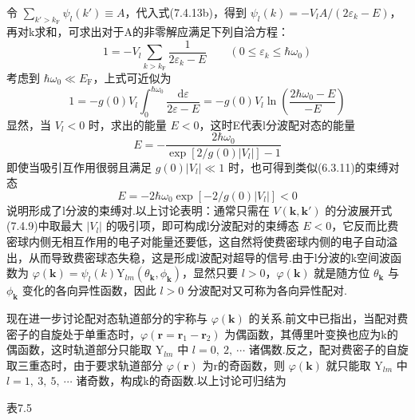 令 $\sum\limits_{k'>k_{\mathrm{F}}}\psi_{l}(k')\equiv A$，代入式(7.4.13b)，得到 $\psi_{l}(k)=-V_{l}A/\left(2\varepsilon_{k}-E\right)$，再对k求和，可求出对于A的非零解应满足下列自洽方程：
\begin{equation}
  1=-V_{l}\sum_{k>k_{\mathrm{F}}}\frac{1}{2\varepsilon_{k}-E}
  \qquad\left(0\leqslant\varepsilon_{k}\leqslant\hbar\omega_{0}\right)
\end{equation}
考虑到 $\hbar\omega_{0}\ll E_{\mathrm{F}}$，上式可近似为
\begin{equation}
  1=-g(0)V_{l}\int_{0}^{\hbar\omega_{0}}\frac{\mathrm{d}\varepsilon}{2\varepsilon-E}
  =-g(0)V_{l}\ln\left(\frac{2\hbar\omega_{0}-E}{-E}\right)
\end{equation}
显然，当 $V_{l}<0$ 时，求出的能量 $E<0$，这时E代表l分波配对态的能量
\begin{equation}
  E=-\frac{2\hbar\omega_{0}}{\exp\left[2/g(0)\left|V_{l}\right|\right]-1}
\end{equation}
即使当吸引互作用很弱且满足 $g(0)\left|V_{l}\right|\ll1$ 时，也可得到类似(6.3.11)的束缚对态
\begin{equation}
  E=-2\hbar\omega_{0}\exp\left[-2/g(0)\left|V_{l}\right|\right]<0
\end{equation}
说明形成了l分波的束缚对.以上讨论表明：通常只需在 $V\left(\boldsymbol{k},\boldsymbol{k}'\right)$ 的分波展开式(7.4.9)中取最大 $\left|V_{l}\right|$ 的吸引项，即可构成l分波配对的束缚态 $E<0$，它反而比费密球内侧无相互作用的电子对能量还要低，这自然将使费密球内侧的电子自动溢出，从而导致费密球态失稳，这是形成l波配对超导的信号.由于l分波的k空间波函数为 $\varphi(\boldsymbol{k})=\psi_{l}(k)\mathrm{Y}_{lm}\left(\theta_{\boldsymbol{k}},\phi_{\boldsymbol{k}}\right)$，显然只要 $l>0$，$\varphi(\boldsymbol{k})$ 就是随方位 $\theta_{\boldsymbol{k}}$ 与 $\phi_{\boldsymbol{k}}$ 变化的各向异性函数，因此 $l>0$ 分波配对又可称为各向异性配对.

现在进一步讨论配对态轨道部分的宇称与 $\varphi(\boldsymbol{k})$ 的关系.前文中已指出，当配对费密子的自旋处于单重态时，$\varphi\left(\boldsymbol{r}=\boldsymbol{r}_{1}-\boldsymbol{r}_{2}\right)$ 为偶函数，其傅里叶变换也应为k的偶函数，这时轨道部分只能取 $\mathrm{Y}_{lm}$ 中 $l=0,\ 2,\ \cdots$ 诸偶数.反之，配对费密子的自旋取三重态时，由于要求轨道部分 $\varphi\left(\boldsymbol{r}\right)$ 为r的奇函数，则 $\varphi(\boldsymbol{k})$ 就只能取 $\mathrm{Y}_{lm}$ 中 $l=1,\ 3,\ 5,\ \cdots$ 诸奇数，构成k的奇函数.以上讨论可归结为

表7.5

